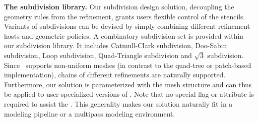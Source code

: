 \noindent\textbf{The subdivision library.}
Our subdivision design solution, decoupling the geometry rules from
the refinement, grants users flexible control of the stencils.
Variants of subdivisions can be devised by simply combining different
refinement hosts and geometric policies.  A combinatory subdivision
set is provided within our subdivision library. It includes
Catmull-Clark subdivision, Doo-Sabin subdivision, Loop subdivision,
Quad-Triangle subdivision and $\sqrt{3}$ subdivision. Since \cgalpoly\ 
supports non-uniform meshes (in contrast to the quad-tree or
patch-based implementation), chains of different refinements are
naturally supported.
Furthermore, our solution is parameterized with the mesh structure and
can thus be applied to user-specialized versions of \cgalpoly.  Note
that no special flag or attribute is required to assist the \tr . This
generality makes our solution naturally fit in a modeling pipeline or a
multipass modeling environment.


 

